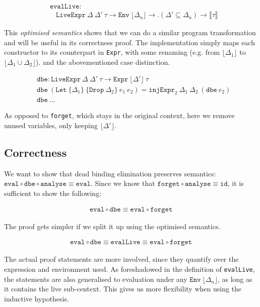\documentclass[sigplan,nonacm,screen,review,timestamp]{acmart}
\newcommand{\I}[1]{\texttt{#1}\xspace}
\newcommand{\Interpret}[1]{\llbracket #1 \rrbracket\xspace}
\newcommand{\Floor}[1]{\lfloor #1 \rfloor\xspace}
\begin{document}
\begin{align*}
  &\I{evalLive} : \\
  &\ \ \ \ \I{LiveExpr}\ \Delta\ \Delta'\ \tau \to  
           \I{Env}\ \Floor{\Delta_u} \to  
           .(\Delta' \subseteq \Delta_u) \to  
           \Interpret{\tau}
\end{align*}

This \emph{optimised semantics} shows that we can do a similar program transformation
and will be useful in its correctness proof.
The implementation simply maps each constructor to its counterpart in \I{Expr},
with some renaming
(e.g. from $\Floor{\Delta_1}$ to $\Floor{\Delta_1 \cup \Delta_2}$).
and the abovementioned case distinction.

\begin{align*}
  &\I{dbe} :  \I{LiveExpr}\ \Delta\ \Delta'\ \tau \to \I{Expr}\ \Floor{\Delta'}\ \tau  \\
  &\I{dbe}\ (\I{Let}\ \{\Delta_1\}\ \{\I{Drop}\ \Delta_2\}\ e_1\ e_2) =
      \I{injExpr}_2\ \Delta_1\ \Delta_2\ (\I{dbe}\ e_2)  \\
  &\I{dbe}\ \ldots
\end{align*}

As opposed to \I{forget}, which stays in the original context,
here we remove unused variables, only keeping $\Floor{\Delta'}$.

\subsection{Correctness}

We want to show that dead binding elimination preserves semantics:
$\I{eval} \circ \I{dbe} \circ \I{analyse} \equiv \I{eval}$.
Since we know that $\I{forget} \circ \I{analyse} \equiv \I{id}$,
it is sufficient to show the following:

\begin{align*}
  \I{eval} \circ \I{dbe} \equiv \I{eval} \circ \I{forget}
\end{align*}

The proof gets simpler if we split it up using the optimised semantics.

\begin{align*}
  \I{eval} \circ \I{dbe} \equiv \I{evalLive} \equiv \I{eval} \circ \I{forget}
\end{align*}

The actual proof statements are more involved,
since they quantify over the expression and environment used.
As foreshadowed in the definition of \I{evalLive}, the statements are also generalised
to evaluation under any $\I{Env}\ \Floor{\Delta_u}$,
as long as it contains the live sub-centext.
This gives us more flexibility when using the inductive hypothesis.
\end{document}
